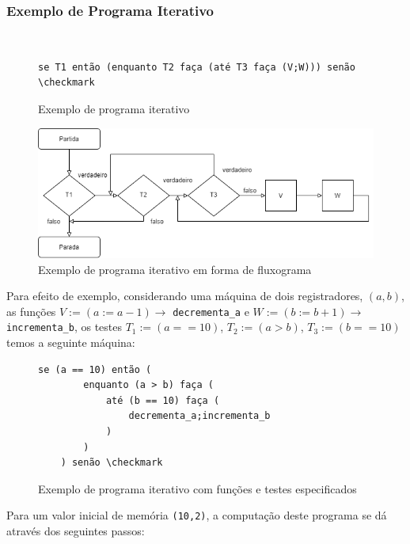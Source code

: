 \documentclass[12pt,fleqn]{article}
\begin{document}
\subsubsection{Exemplo de Programa Iterativo}
~
\begin{figure}[H]
\begin{Verbatim}[commandchars=\\\{\},codes={\catcode`\$=3\catcode`\^=7}]
    se T1 então (enquanto T2 faça (até T3 faça (V;W))) senão \checkmark
\end{Verbatim}
\caption{Exemplo de programa iterativo}
\end{figure}

\begin{figure}[H]
    \includegraphics[width=\linewidth]{img/iterativo_ex}
    \caption{Exemplo de programa iterativo em forma de fluxograma}
\end{figure}

Para efeito de exemplo, considerando uma máquina de dois registradores, $(a,b)$,
as funções $V := (a := a-1) \rightarrow$ \verb|decrementa_a| e $W := (b := b+1)
\rightarrow$ \verb|incrementa_b|, os testes $T_1 := (a == 10)$, $T_2 := (a >
b)$, $T_3 := (b == 10)$ temos a seguinte máquina:

\begin{figure}[H]
\begin{Verbatim}[commandchars=\\\{\},codes={\catcode`\$=3\catcode`\^=7}]
    se (a == 10) então (
        enquanto (a > b) faça (
            até (b == 10) faça (
                decrementa_a;incrementa_b
            )
        )
    ) senão \checkmark
\end{Verbatim}
\caption{Exemplo de programa iterativo com funções e testes especificados}
\end{figure}

\noindent
Para um valor inicial de memória \verb|(10,2)|, a computação deste programa se
dá através dos seguintes passos:
\end{document}
